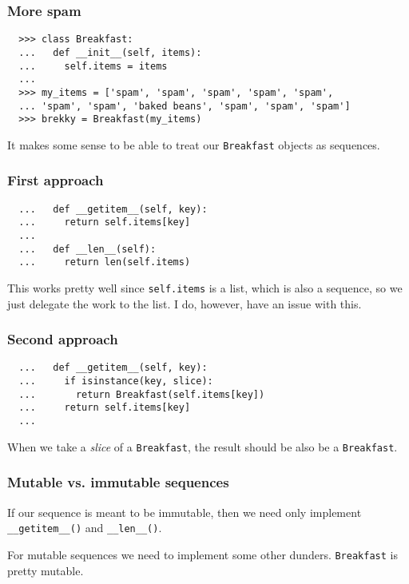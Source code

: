 \documentclass[aspectratio=169]{beamer}
\begin{document}
\begin{frame}[fragile]
  \frametitle{More spam}
  
  \begin{verbatim}
  >>> class Breakfast:
  ...   def __init__(self, items):
  ...     self.items = items
  ...
  >>> my_items = ['spam', 'spam', 'spam', 'spam', 'spam',
  ... 'spam', 'spam', 'baked beans', 'spam', 'spam', 'spam']
  >>> brekky = Breakfast(my_items)
  \end{verbatim}
  \bigbreak
  
  It makes some sense to be able to treat our \texttt{Breakfast} objects as sequences.
  
  \end{frame}
\begin{frame}[fragile]
  \frametitle{First approach}
  
  \begin{verbatim}
  ...   def __getitem__(self, key):
  ...     return self.items[key]
  ...
  ...   def __len__(self):
  ...     return len(self.items)
  \end{verbatim}
  \bigbreak
  
  This works pretty well since \texttt{self.items} is a list, which is also a sequence, so we just delegate the work to the list.
  I do, however, have an issue with this.
 
  \end{frame}
\begin{frame}[fragile]
  \frametitle{Second approach}
  
  \begin{verbatim}
  ...   def __getitem__(self, key):
  ...     if isinstance(key, slice):
  ...       return Breakfast(self.items[key])
  ...     return self.items[key]
  ...
  \end{verbatim}
  \bigbreak
  
  When we take a \emph{slice} of a \texttt{Breakfast}, the result should be also be a \texttt{Breakfast}.
  \end{frame}

 \begin{frame}
   \frametitle{Mutable vs. immutable sequences}
   
   If our sequence is meant to be immutable, then we need only implement \texttt{\_\_getitem\_\_()}
   and \texttt{\_\_len\_\_()}.
   
   \bigbreak
   
   For mutable sequences we need to implement some other dunders. \texttt{Breakfast} is pretty mutable.
 \end{frame}  
 
\end{document}
